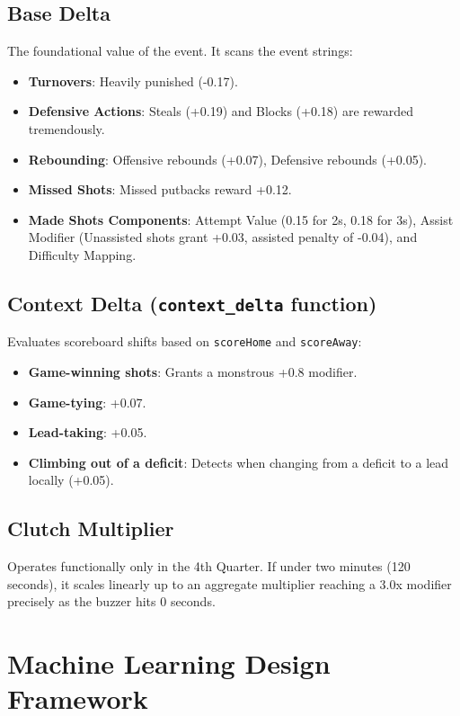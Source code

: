 \documentclass[12pt,a4paper]{article}
\begin{document}
\subsection{Base Delta}
The foundational value of the event. It scans the event strings:
\begin{itemize}
    \item \textbf{Turnovers}: Heavily punished (-0.17).
    \item \textbf{Defensive Actions}: Steals (+0.19) and Blocks (+0.18) are rewarded tremendously.
    \item \textbf{Rebounding}: Offensive rebounds (+0.07), Defensive rebounds (+0.05).
    \item \textbf{Missed Shots}: Missed putbacks reward +0.12.
    \item \textbf{Made Shots Components}: Attempt Value (0.15 for 2s, 0.18 for 3s), Assist Modifier (Unassisted shots grant +0.03, assisted penalty of -0.04), and Difficulty Mapping.
\end{itemize}

\subsection{Context Delta (\texttt{context\_delta} function)}
Evaluates scoreboard shifts based on \texttt{scoreHome} and \texttt{scoreAway}:
\begin{itemize}
    \item \textbf{Game-winning shots}: Grants a monstrous +0.8 modifier.
    \item \textbf{Game-tying}: +0.07.
    \item \textbf{Lead-taking}: +0.05.
    \item \textbf{Climbing out of a deficit}: Detects when changing from a deficit to a lead locally (+0.05).
\end{itemize}

\subsection{Clutch Multiplier}
Operates functionally only in the 4th Quarter. If under two minutes (120 seconds), it scales linearly up to an aggregate multiplier reaching a 3.0x modifier precisely as the buzzer hits 0 seconds.

\section{Machine Learning Design Framework}
\end{document}
